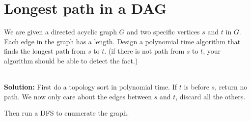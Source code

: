 \section{Longest path in a DAG}

We are given a directed acyclic graph $G$ and two specific vertices $s$ and $t$ in $G$. Each edge in the graph has a length. Design a polynomial time algorithm that finds the longest path from $s$ to $t$. (if there is not path from $s$ to $t$, your algorithm should be able to detect the fact.)

\ \\{\bf Solution:} First do a topology sort in polynomial time. If $t$ is before $s$, return no path. We now only care about the edges between $s$ and $t$, discard all the others. 

Then run a DFS to enumerate the graph.